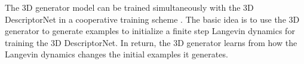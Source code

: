 \documentclass[10pt,twocolumn,letterpaper]{article}
\begin{document}
The 3D generator model can be trained simultaneously with the 3D DescriptorNet  in a cooperative training scheme \cite{xie2016cooperative}. The basic idea is to use the 3D generator to generate examples to initialize a finite step Langevin dynamics for training the 3D DescriptorNet. In return, the 3D generator learns from how the Langevin dynamics changes the initial examples it generates. 


 
\end{document}
